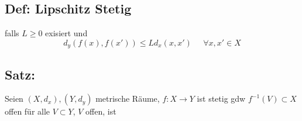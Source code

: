 \subsection{Def: Lipschitz Stetig}
falls $L\geq 0$ exisiert und
$$
d_y(f(x),f(x')) \leq Ld_x(x,x') \;\;\;\;\; \forall x,x'\in X
$$

\subsection{Satz: }
Seien $(X,d_x), (Y,d_y)$ metrische Räume, $f:X\rightarrow Y$ ist stetig gdw $f^{-1}(V) \subset X$ offen für alle $V\subset Y$, $V$ offen, ist















